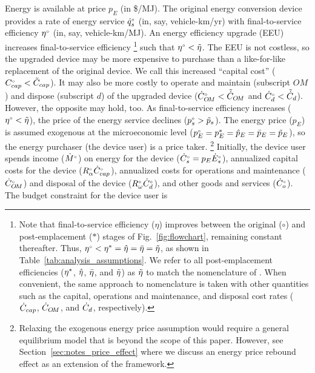 \documentclass[12pt]{article}\usepackage[]{graphicx}\usepackage[]{xcolor}
\begin{document}
Energy is available at price $p_E$ (in \$/MJ).
The original energy conversion device provides a rate of energy service 
${}{\dot{q}}^{\scriptscriptstyle \circ}_s$ (in, say, vehicle-km/yr)
with final-to-service efficiency ${}{\eta}^{\scriptscriptstyle \circ}$ (in, say, vehicle-km/MJ).
An energy efficiency upgrade (EEU) increases
final-to-service efficiency%
\footnote{
  Note that final-to-service efficiency ($\eta$) improves
  between the original ($\circ$) and
  post-emplacement ($*$)
  stages of Fig.~\ref{fig:flowchart}, remaining constant thereafter.
  Thus, ${}{\eta}^{\scriptscriptstyle \circ} < {\eta}^* = \hat{\eta} = \bar{\eta} = \tilde{\eta}$,
  as shown in Table~\ref{tab:analysis_assumptions}.
  We refer to all post-emplacement efficiencies 
  (${\eta}^*$, $\hat{\eta}$, $\bar{\eta}$, and $\tilde{\eta}$)
  as $\tilde{\eta}$
  to match the nomenclature of \citet{Borenstein:2015aa}.
  When convenient, the same approach to nomenclature 
  is taken with other quantities such as 
  the capital, 
  operations and maintenance, and
  disposal cost rates
  ($\dot{C}_{cap}$, $\dot{C}_{O\!M}$, and $\dot{C}_d$, respectively).
}
such that
${}{\eta}^{\scriptscriptstyle \circ} < \tilde{\eta}$.
The EEU is not costless, so
the upgraded device may be more expensive to purchase
than a like-for-like replacement of the original device.
We call this increased ``capital cost'' 
(${}{C}^{\scriptscriptstyle \circ}_{cap} < \tilde{C}_{cap}$). 
It may also 
be more costly to operate and maintain (subscript $OM$) and
dispose (subscript $d$) 
of the upgraded device
(${}{\dot{C}}^{\scriptscriptstyle \circ}_{O\!M} < \tilde{\dot{C}}_{O\!M}$ and 
${}{\dot{C}}^{\scriptscriptstyle \circ}_d < \tilde{\dot{C}}_d$). 
However, the opposite may hold, too.
As final-to-service efficiency increases (${}{\eta}^{\scriptscriptstyle \circ} < \tilde{\eta}$),
the price of the energy service declines (${}{p}^{\scriptscriptstyle \circ}_s > \tilde{p}_s$).
The energy price ($p_E$) is assumed exogenous
at the microeconomic level
(${}{p}^{\scriptscriptstyle \circ}_E = {p}^*_E = \hat{p}_E = \bar{p}_E  = \tilde{p}_E$),
so the energy purchaser (the device user) is a price taker.%
\footnote{
  Relaxing the exogenous energy price assumption
  would require a general equilibrium model 
  that is beyond the scope of this paper.
  However, see Section~\ref{sec:notes_price_effect}
  where we discuss an energy price rebound effect
  as an extension of the framework.
}
%
Initially, the device user spends income (${}{\dot{M}}^{\scriptscriptstyle \circ}$)
on energy for the device (${}{\dot{C}}^{\scriptscriptstyle \circ}_s = p_E {}{\dot{E}}^{\scriptscriptstyle \circ}_s$), 
annualized capital costs for the device 
(${}{R}^{\scriptscriptstyle \circ}_\alpha {}{\dot{C}}^{\scriptscriptstyle \circ}_{cap}$), 
annualized costs for operations and maintenance (${}{\dot{C}}^{\scriptscriptstyle \circ}_{O\!M}$) and
disposal of the device 
(${}{R}^{\scriptscriptstyle \circ}_\omega {}{\dot{C}}^{\scriptscriptstyle \circ}_d$), and 
other goods and services (${}{\dot{C}}^{\scriptscriptstyle \circ}_o$).
The budget constraint for the device user is
\end{document}
